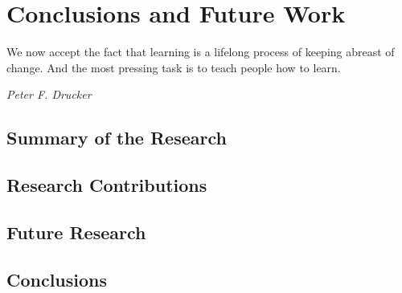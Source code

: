 \chapter{Conclusions and Future Work\label{cha:conclusion}}
\epigraph{We now accept the fact that learning is a lifelong process of keeping
abreast of change. And the most pressing task is to teach people how to
learn.}{\textit{Peter F. Drucker}}

\section{Summary of the Research}

\section{Research Contributions}

\section{Future Research}

\section{Conclusions}
